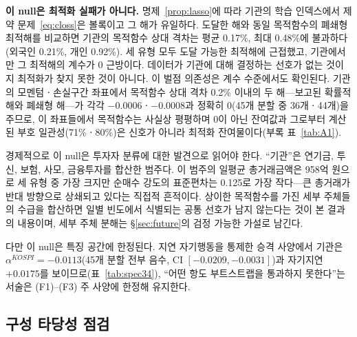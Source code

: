 \textbf{이 null은 최적화 실패가 아니다.} 명제~\ref{prop:lasso}에 따라 기관의 학습
인덱스에서 제약 문제~\eqref{eq:closs}은 볼록이고 그 해가 유일하다. 도달한 해와 동일
목적함수의 폐쇄형 최적해를 비교하면 기관의 목적함수 상대 격차는 평균 0.17\%, 최대
0.48\%에 불과하다(외국인 0.21\%, 개인 0.92\%). 세 유형 모두 도달 가능한 최적해에
근접했고, 기관에서만 그 최적해의 계수가 0 근방이다. 데이터가 기관에 대해 결정하는
선호가 없는 것이지 최적화가 찾지 못한 것이 아니다. 이 벌점 의존성은 계수 수준에서도
확인된다. 기관의 모멘텀ㆍ손실구간 좌표에서 목적함수 상대 격차 0.2\% 이내의 두
해---보고된 확률적 해와 폐쇄형 해---가 각각 $-0.0006$ㆍ$-0.0008$과 정확히 0(45개
분할 중 36개ㆍ44개)을 주므로, 이 좌표들에서 목적함수는 사실상 평평하며 0이 아닌
잔여값과 그로부터 계산된 부호 일관성(71\%ㆍ80\%)은 신호가 아니라 최적화
잔여물이다(부록 표~\ref{tab:A1}).

경제적으로 이 null은 투자자 분류에 대한 발견으로 읽어야 한다. ``기관''은 연기금,
투신, 보험, 사모, 금융투자를 합산한 범주다. 이 범주의 일평균 총거래금액은 958억
원으로 세 유형 중 가장 크지만 순매수 강도의 표준편차는 0.125로 가장 작다---큰
총거래가 반대 방향으로 상쇄되고 있다는 직접적 흔적이다. 상이한 목적함수를 가진 세부
주체들의 수급을 합산하면 일별 빈도에서 식별되는 공통 선호가 남지 않는다는 것이 본
결과의 내용이며, 세부 주체 분해는 \S\ref{sec:future}의 검정 가능한 가설로 남긴다.

다만 이 null은 특징 공간에 한정된다. 지연 자기행동을 통제한 승격 사양에서 기관은
$\alpha^{KOSPI}=-0.0113$(45개 분할 전부 음수, CI $[-0.0209,-0.0031]$)과 자기지연
$+0.0175$를 보이므로(표~\ref{tab:spec34}), ``어떤 항도 부트스트랩을 통과하지
못한다''는 서술은 (F1)--(F3) 주 사양에 한정해 유지한다.

\subsection{구성 타당성 점검}
\label{sec:construct}

